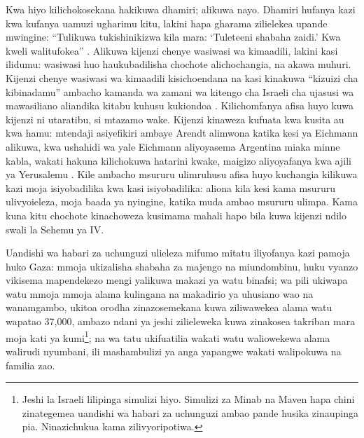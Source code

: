 Kwa hiyo kilichokosekana hakikuwa dhamiri; alikuwa nayo. Dhamiri hufanya kazi kwa kufanya uamuzi ugharimu kitu, lakini hapa gharama zilielekea upande mwingine: “Tulikuwa tukishinikizwa kila mara: ‘Tuleteeni shabaha zaidi.’ Kwa kweli walitufokea” \autocite{abraham2024lavender}. Alikuwa kijenzi chenye wasiwasi wa kimaadili, lakini kasi ilidumu: wasiwasi huo haukubadilisha chochote alichochangia, na akawa muhuri. Kijenzi chenye wasiwasi wa kimaadili kisichoendana na kasi kinakuwa “kizuizi cha kibinadamu” ambacho kamanda wa zamani wa kitengo cha Israeli cha ujasusi wa mawasiliano aliandika kitabu kuhusu kukiondoa \autocite{ys2021humanmachine}. Kilichomfanya afisa huyo kuwa kijenzi ni utaratibu, si mtazamo wake. Kijenzi kinaweza kufuata kwa kusita au kwa hamu: mtendaji asiyefikiri ambaye Arendt alimwona katika kesi ya Eichmann \autocite{arendt1963eichmann} alikuwa, kwa ushahidi wa yale Eichmann aliyoyasema Argentina miaka minne kabla, wakati hakuna kilichokuwa hatarini kwake, maigizo aliyoyafanya kwa ajili ya Yerusalemu \autocite{stangneth2014eichmann}. Kile ambacho msururu ulimruhusu afisa huyo kuchangia kilikuwa kazi moja isiyobadilika kwa kasi isiyobadilika: aliona kila kesi kama msururu ulivyoieleza, moja baada ya nyingine, katika muda ambao msururu ulimpa. Kama kuna kitu chochote kinachoweza kusimama mahali hapo bila kuwa kijenzi ndilo swali la Sehemu ya IV.

Uandishi wa habari za uchunguzi ulieleza mifumo mitatu iliyofanya kazi pamoja huko Gaza: mmoja ukizalisha shabaha za majengo na miundombinu, huku vyanzo vikisema mapendekezo mengi yalikuwa makazi ya watu binafsi; wa pili ukiwapa watu mmoja mmoja alama kulingana na makadirio ya uhusiano wao na wanamgambo, ukitoa orodha zinazosemekana kuwa ziliwawekea alama watu wapatao 37,000, ambazo ndani ya jeshi zilieleweka kuwa zinakosea takriban mara moja kati ya kumi\footnote{Jeshi la Israeli lilipinga simulizi hiyo. Simulizi za Minab na Maven hapa chini zinategemea uandishi wa habari za uchunguzi ambao pande husika zinaupinga pia. Ninazichukua kama zilivyoripotiwa.}; na wa tatu ukifuatilia wakati watu waliowekewa alama walirudi nyumbani, ili mashambulizi ya anga yapangwe wakati walipokuwa na familia zao.


